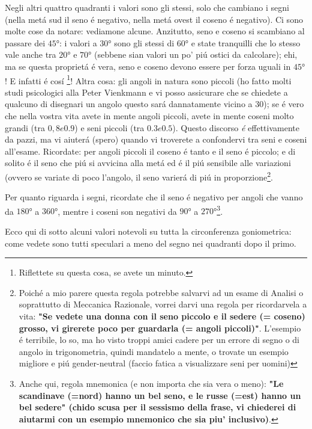 Negli altri quattro quadranti i valori sono gli stessi, solo che cambiano i segni (nella met\'a sud il seno \'e negativo, nella met\'a ovest il coseno \'e negativo).
Ci sono molte cose da notare: vediamone alcune. Anzitutto, seno e coseno si scambiano al passare dei $\ang{45}$: i valori a $\ang{30}$ sono gli stessi di $\ang{60}$ e state tranquilli
che lo stesso vale anche tra $\ang{20}$ e $\ang{70}$ (sebbene sian valori un po' pi\'u ostici da calcolare); ehi, ma se questa propriet\'a \'e vera, seno e coseno devono
essere per forza uguali in $\ang{45}$! E infatti \'e cos\'i \footnote{Riflettete su questa cosa, se avete un minuto.}! Altra cosa: gli angoli in natura sono piccoli
(ho fatto molti studi psicologici alla Peter Vienkmann e vi posso assicurare che se chiedete a qualcuno di disegnari un angolo questo sar\'a dannatamente vicino a $30$);
se \'e vero che nella vostra vita avete in mente angoli piccoli, avete in mente coseni molto grandi (tra $0,8 e 0.9$) e seni piccoli (tra $0.3 e 0.5$). Questo discorso {\em \'e}
effettivamente da pazzi, ma vi aiuter\'a (spero) quando vi troverete a confondervi tra seni e coseni all'esame. Ricordate: per angoli piccoli il coseno \'e tanto e il seno \'e
piccolo; e di solito \'e il seno che pi\'u si avvicina alla met\'a ed \'e il pi\'u sensibile alle variazioni (ovvero se variate di poco l'angolo, il seno varier\'a di pi\'u
in proporzione\footnote{Poich\'e a mio parere questa regola potrebbe salvarvi ad un esame di Analisi o soprattutto di Meccanica Razionale, vorrei darvi una regola per ricordarvela
a vita: {\bf "Se vedete una donna con il seno piccolo e il sedere (= coseno) grosso, vi girerete poco per guardarla (= angoli piccoli)"}. L'esempio \'e terribile, lo so,
ma ho visto troppi amici cadere per un errore di segno o di angolo in trigonometria, quindi mandatelo a mente, o trovate un esempio migliore e pi\'u gender-neutral (faccio
fatica a visualizzare seni per uomini)}.

Per quanto riguarda i segni, ricordate che il seno \'e negativo per angoli che vanno da $\ang{180}$ a $\ang{360}$, 
mentre i coseni son negativi da $\ang{90}$ a $\ang{270}$\footnote{Anche qui, regola mnemonica (e non importa che 
sia vera o meno): {\bf "Le scandinave (=nord) hanno un bel seno, e le russe (=est) hanno un bel sedere" (chido scusa per il sessismo della frase, 
vi chiederei di aiutarmi con un esempio mnemonico che sia piu' inclusivo)}.}.

Ecco qui di sotto alcuni valori notevoli su tutta la circonferenza goniometrica: come vedete sono tutti speculari a meno del segno nei quadranti
dopo il primo.

